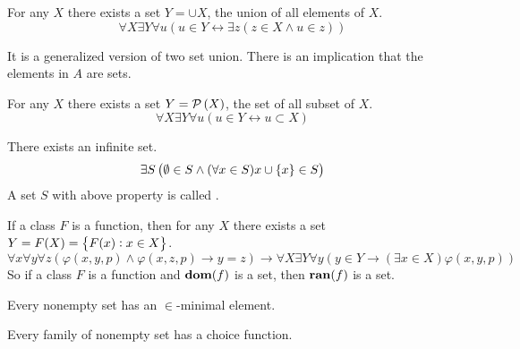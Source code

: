 \begin{axiom}
    For any $X$ there exists a set $Y = \cup X$, the union of all elements of $X$.
    \begin{equation}
        \forall X \exists Y \forall u \left(u \in Y \leftrightarrow \exists z (z \in X \wedge u \in z ) \right)
    \end{equation}
    
    It is a generalized version of two set union. There is an implication that the elements in $A$ are sets.
\end{axiom}

\begin{axiom}
    For any $X$ there exists a set $Y = \mathcal{P}\left( X \right)$, the set of all subset of $X$.
    \begin{equation}
        \forall X \exists Y \forall u (u \in Y \leftrightarrow u \subset X )
    \end{equation}
\end{axiom}

\begin{axiom}
    There exists an infinite set.
    \begin{equation}
        \exists S \left( \emptyset \in S \wedge (\forall x \in S ) x \cup \set{x} \in S \right)
    \end{equation}
    A set $S$ with above property is called .
\end{axiom}

\begin{axiom}
    If a class $F$ is a function, then for any $X$ there exists a set $Y = F(X) = \set{F(x): x \in X}$.
    \begin{equation}
        \forall x \forall y \forall z \left( \varphi(x,y,p) \wedge \varphi(x,z,p) \rightarrow y = z \right) \rightarrow \forall X \exists Y \forall y \left( y \in Y \rightarrow (\exists x \in X ) \varphi(x,y,p) \right)
    \end{equation}
    So if a class $F$ is a function and $\mathbf{dom}(f)$ is a set, then $\mathbf{ran}(f)$ is a set.
\end{axiom}

\begin{axiom}\label{axiomofregularation}
    Every nonempty set has an $\in$-minimal element.
\end{axiom}

\begin{axiom}\label{axiomofchoice}
    Every family of nonempty set has a choice function.
\end{axiom}

